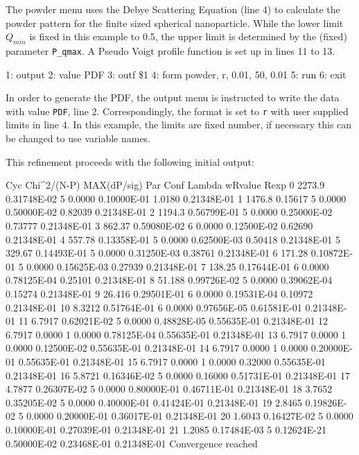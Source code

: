 The powder menu uses the Debye Scattering Equation (line 4) to calculate
the powder pattern for the finite sized spherical nanoparticle. While
the lower limit ${Q_{min}}$ is fixed in this example to 0.5, the upper limit
is determined by the (fixed) parameter {\tt P\_qmax}. A Pseudo Voigt profile
function is set up in lines 11 to 13.

\begin{MacVerbatim}
 1: output
 2: value PDF
 3: outf \$1
 4: form powder, r, 0.01,  50, 0.01
 5: run
 6: exit
\end{MacVerbatim}
 
In order to generate the PDF, the output menu is instructed to write the
data with value {\tt PDF}, line 2. Correspondingly, the format is set to
{\tt r} with user supplied limits in line 4. In this example, the limits
are fixed number, if necessary this can be changed to use variable names.

This refinement proceeds with the following initial output:

\begin{MacVerbatim}
Cyc Chi^2/(N-P)   MAX(dP/sig) Par   Conf          Lambda       wRvalue      Rexp
  0   2273.9      0.31748E-02   5   0.0000      0.10000E-01   1.0180      0.21348E-01
  1   1476.8      0.15617       5   0.0000      0.50000E-02  0.82039      0.21348E-01
  2   1194.3      0.56799E-01   5   0.0000      0.25000E-02  0.73777      0.21348E-01
  3   862.37      0.59080E-02   6   0.0000      0.12500E-02  0.62690      0.21348E-01
  4   557.78      0.13358E-01   5   0.0000      0.62500E-03  0.50418      0.21348E-01
  5   329.67      0.14493E-01   5   0.0000      0.31250E-03  0.38761      0.21348E-01
  6   171.28      0.10872E-01   5   0.0000      0.15625E-03  0.27939      0.21348E-01
  7   138.25      0.17644E-01   6   0.0000      0.78125E-04  0.25101      0.21348E-01
  8   51.188      0.99726E-02   5   0.0000      0.39062E-04  0.15274      0.21348E-01
  9   26.416      0.29501E-01   6   0.0000      0.19531E-04  0.10972      0.21348E-01
 10   8.3212      0.51764E-01   6   0.0000      0.97656E-05  0.61581E-01  0.21348E-01
 11   6.7917      0.62021E-02   5   0.0000      0.48828E-05  0.55635E-01  0.21348E-01
 12   6.7917       0.0000       1   0.0000      0.78125E-04  0.55635E-01  0.21348E-01
 13   6.7917       0.0000       1   0.0000      0.12500E-02  0.55635E-01  0.21348E-01
 14   6.7917       0.0000       1   0.0000      0.20000E-01  0.55635E-01  0.21348E-01
 15   6.7917       0.0000       1   0.0000      0.32000      0.55635E-01  0.21348E-01
 16   5.8721      0.16346E-02   5   0.0000      0.16000      0.51731E-01  0.21348E-01
 17   4.7877      0.26307E-02   5   0.0000      0.80000E-01  0.46711E-01  0.21348E-01
 18   3.7652      0.35205E-02   5   0.0000      0.40000E-01  0.41424E-01  0.21348E-01
 19   2.8465      0.19826E-02   5   0.0000      0.20000E-01  0.36017E-01  0.21348E-01
 20   1.6043      0.16427E-02   5   0.0000      0.10000E-01  0.27039E-01  0.21348E-01
 21   1.2085      0.17484E-03   5  0.12624E-21  0.50000E-02  0.23468E-01  0.21348E-01
Convergence reached
\end{MacVerbatim}

